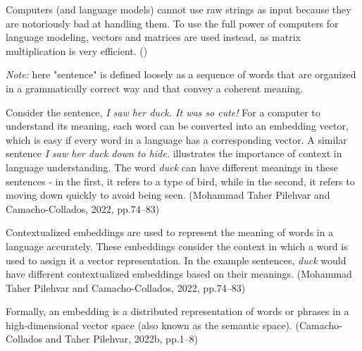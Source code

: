Computers (and language models) cannot use raw strings as input because they are notoriously bad at handling them. To use the full power of computers for language modeling, vectors and matrices are used instead, as matrix multiplication is very efficient. (\cite{tunstall_natural_2022})

\textit{Note:} here "sentence" is defined loosely as a sequence of words that are organized in a grammatically correct way and that convey a coherent meaning.

Consider the sentence, \textit{I saw her duck. It was so cute!} For a computer to understand its meaning, each word can be converted into an embedding vector, which is easy if every word in a language has a corresponding vector. A similar sentence \textit{I saw her duck down to hide.} illustrates the importance of context in language understanding. The word \textit{duck} can have different meanings in these sentences - in the first, it refers to a type of bird, while in the second, it refers to moving down quickly to avoid being seen. (Mohammad Taher Pilehvar and Camacho-Collados, 2022, pp.74–83)

Contextualized embeddings are used to represent the meaning of words in a language accurately. These embeddings consider the context in which a word is used to assign it a vector representation. In the example sentences, \textit{duck} would have different contextualized embeddings based on their meanings. (Mohammad Taher Pilehvar and Camacho-Collados, 2022, pp.74–83)

Formally, an embedding is a distributed representation of words or phrases in a high-dimensional vector space (also known as the semantic space). (Camacho-Collados and Taher Pilehvar, 2022b, pp.1–8)